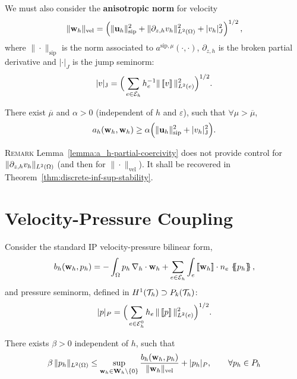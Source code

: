 \documentclass[25pt, a0paper, portrait, leqno, margin=0mm, innermargin=25mm,
blockverticalspace=15mm, colspace=15mm, subcolspace=8mm]{tikzposter}
\begin{document}
{\begin{multicols*}{3}
    We must also consider the \textbf{anisotropic norm} for velocity
    $$
    \|\wh\|_\mathrm{vel} = \left(\|\uh\|_{\text{sip}}^2 +
      \|\partial_{z,h}\vh\|_{L^2(\Omega)}^2 + |\vh|_J^2\right)^{1/2},
    $$
    where $\|\cdot\|_{\text{sip}}$ is the norm associated to
    $a^{\text{sip},\mu}(\cdot,\cdot)$, $\partial_{z,h}$ is the broken
    partial derivative and $|\cdot|_J$ is the jump seminorm:
    $$
    \seminormJ{\vv} = \Big (\sum_{e\in\Eh} h_e^{-1} \norm[L^2(e)]{\jump\vv}^2 \Big ) ^{1/2}.
    $$

    \begin{lemma}
      \label{lemma:a_h-partial-coercivity}
      There exist $\overline{\mu} $ and $ \alpha >0$  (independent of $h$ and  $\varepsilon$), such that
      $ \forall \mu > \overline{\mu}$,
      $$
        a_h ( \wh, \wh ) \ge \alpha \Big ( \normsip{\uh}^2
        + \seminormJ{\vh}^2  \Big ).
        $$
    \end{lemma}

    \begin{paragraph}{\textsc{Remark}}
      Lemma~\ref{lemma:a_h-partial-coercivity} does not provide
      control for $\|\partial_{z,h} \vh\|_{L^2(\Omega)}$ (and then for
      $\|\cdot\|_\mathrm{vel}$). It shall be recovered in
      Theorem~\ref{thm:discrete-inf-sup-stability}.
    \end{paragraph}

    \section{\color{colorTwo}Velocity-Pressure  Coupling\dotfill}

    Consider the standard IP velocity-pressure bilinear form,
    $$
    b_h(\wh, \ph )= -\int_{\Omega} \ph\, \gradh \cdot \wh +
    \sum_{e\in\Eh} \int_e \jump{\wh} \cdot n_e\, \average{\ph},
    $$
    and pressure seminorm, defined in
    $ H^1(\Th ) \supset P_{k}( \Th )$:
    $$
    |p|_P  = \Big ( \sum_{e\in\Ehi} h_e \, \| \jump{p} \|_{L^2(e)}^2 \Big )^{1/2}.
    $$

    \begin{lemma} There exists
      \label{lemma:b_h-stability}
      $\beta > 0$ independent of $h$, such that
      $$
      \beta \, \| \ph \|_{L^2(\Omega)} \le \sup_{\wh \in \Wh \setminus
        \{0\}} \frac{b_h ( \wh, \ph )}{\normvel{\wh}}
      + |\ph|_P , \qquad \forall \ph \in \Ph
      $$
    \end{lemma}


\end{multicols*}}
\end{document}
